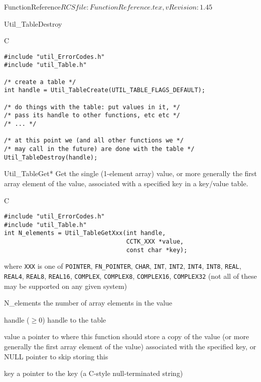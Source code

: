\begin{cactuspart}{5}{FunctionReference}{$RCSfile: FunctionReference.tex,v $}{$Revision: 1.45 $}
\begin{FunctionDescription}{Util\_TableDestroy}
\begin{Example}{C}
\begin{verbatim}
#include "util_ErrorCodes.h"
#include "util_Table.h"

/* create a table */
int handle = Util_TableCreate(UTIL_TABLE_FLAGS_DEFAULT);

/* do things with the table: put values in it, */
/* pass its handle to other functions, etc etc */
/* ... */

/* at this point we (and all other functions we */
/* may call in the future) are done with the table */
Util_TableDestroy(handle);
\end{verbatim}
\end{Example}
\end{FunctionDescription}


\begin{FunctionDescription}{Util\_TableGet*}
\label{Util-TableGet*}
Get the single (1-element array) value, or more generally the first
array element of the value, associated with a specified key in a
key/value table.

\begin{Synopsis}{C}
\begin{verbatim}
#include "util_ErrorCodes.h"
#include "util_Table.h"
int N_elements = Util_TableGetXxx(int handle,
                                  CCTK_XXX *value,
                                  const char *key);
\end{verbatim}
where \verb|XXX| is one of
   \verb|POINTER|, \verb|FN_POINTER|,
   \verb|CHAR|,
   \verb|INT|, \verb|INT2|, \verb|INT4|, \verb|INT8|,
   \verb|REAL|, \verb|REAL4|, \verb|REAL8|, \verb|REAL16|,
   \verb|COMPLEX|, \verb|COMPLEX8|, \verb|COMPLEX16|, \verb|COMPLEX32|
(not all of these may be supported on any given system)
\end{Synopsis}

\begin{Result}{N\_elements}
the number of array elements in the value
\end{Result}

\begin{Parameter}{handle ($\ge 0$)}
handle to the table
\end{Parameter}
\begin{Parameter}{value}
a pointer to where this function should store a copy of the value
(or more generally the first array element of the value) associated
with the specified key,
or NULL pointer to skip storing this
\end{Parameter}
\begin{Parameter}{key}
a pointer to the key (a C-style null-terminated string)
\end{Parameter}


\end{FunctionDescription}
\end{cactuspart}
